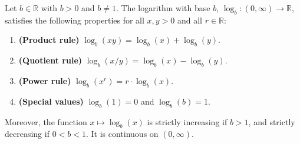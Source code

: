 \begin{proposition} \label{proposition:properties_of_logarithm_with_base_b}
    Let $b \in \mathbb{R}$ with $b > 0$ and $b \neq 1$. The logarithm with base $b$, $\log_b : (0, \infty) \to \mathbb{R}$, satisfies the following properties for all $x, y > 0$ and all $r \in \mathbb{R}$:
    \begin{enumerate}
        \item \textbf{(Product rule)} $\log_b(xy) = \log_b(x) + \log_b(y)$.
        \item \textbf{(Quotient rule)} $\log_b(x/y) = \log_b(x) - \log_b(y)$.
        \item \textbf{(Power rule)} $\log_b(x^r) = r \cdot \log_b(x)$.
        \item \textbf{(Special values)} $\log_b(1) = 0$ and $\log_b(b) = 1$.
    \end{enumerate}
    Moreover, the function $x \mapsto \log_b(x)$ is strictly increasing if $b > 1$, and strictly decreasing if $0 < b < 1$. It is continuous on $(0, \infty)$.
\end{proposition}

